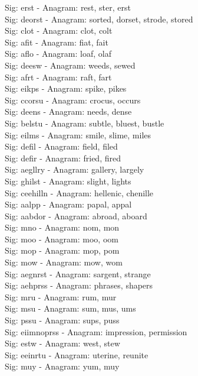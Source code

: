 Sig: {erst} - Anagram: rest, ster, erst \\
Sig: {deorst} - Anagram: sorted, dorset, strode, stored \\
Sig: {clot} - Anagram: clot, colt \\
Sig: {afit} - Anagram: fiat, fait \\
Sig: {aflo} - Anagram: loaf, olaf \\
Sig: {deesw} - Anagram: weeds, sewed \\
Sig: {afrt} - Anagram: raft, fart \\
Sig: {eikps} - Anagram: spike, pikes \\
Sig: {ccorsu} - Anagram: crocus, occurs \\
Sig: {deens} - Anagram: needs, dense \\
Sig: {belstu} - Anagram: subtle, bluest, bustle \\
Sig: {eilms} - Anagram: smile, slime, miles \\
Sig: {defil} - Anagram: field, filed \\
Sig: {defir} - Anagram: fried, fired \\
Sig: {aegllry} - Anagram: gallery, largely \\
Sig: {ghilst} - Anagram: slight, lights \\
Sig: {ceehilln} - Anagram: hellenic, chenille \\
Sig: {aalpp} - Anagram: papal, appal \\
Sig: {aabdor} - Anagram: abroad, aboard \\
Sig: {mno} - Anagram: nom, mon \\
Sig: {moo} - Anagram: moo, oom \\
Sig: {mop} - Anagram: mop, pom \\
Sig: {mow} - Anagram: mow, wom \\
Sig: {aegnrst} - Anagram: sargent, strange \\
Sig: {aehprss} - Anagram: phrases, shapers \\
Sig: {mru} - Anagram: rum, mur \\
Sig: {msu} - Anagram: sum, mus, ums \\
Sig: {pssu} - Anagram: sups, puss \\
Sig: {eiimnoprss} - Anagram: impression, permission \\
Sig: {estw} - Anagram: west, stew \\
Sig: {eeinrtu} - Anagram: uterine, reunite \\
Sig: {muy} - Anagram: yum, muy \\
